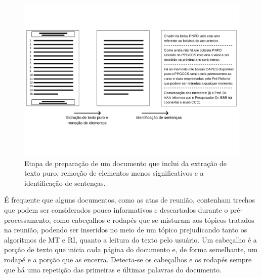 \begin{center}
	\begin{figure}[h!]

		\includegraphics[trim={ 0 100 0 100 },clip,page=1,width=\textwidth]{conteudo/capitulos/figs/preparacao-docs.pdf}

		\caption{Etapa de preparação de um documento que inclui da extração de texto puro,  remoção de elementos menos significativos e a identificação de sentenças.}
		\label{fig:preprocessamento-segmentacao}
	\end{figure}
\end{center}




É frequente que alguns documentos, como as atas de reunião, contenham trechos que podem ser considerados pouco informativos e descartados durante o pré-processamento, como cabeçalhos e rodapés que se misturam aos tópicos tratados na reunião, podendo ser inseridos no meio de um tópico prejudicando tanto os algoritmos de MT e RI, quanto a leitura do texto pelo usuário. Um cabeçalho é a porção de texto que inicia cada página do documento e, de forma semelhante, um rodapé e a porção que as encerra. Detecta-se os cabeçalhos e os rodapés sempre que há uma repetição das primeiras e últimas palavras do documento.


